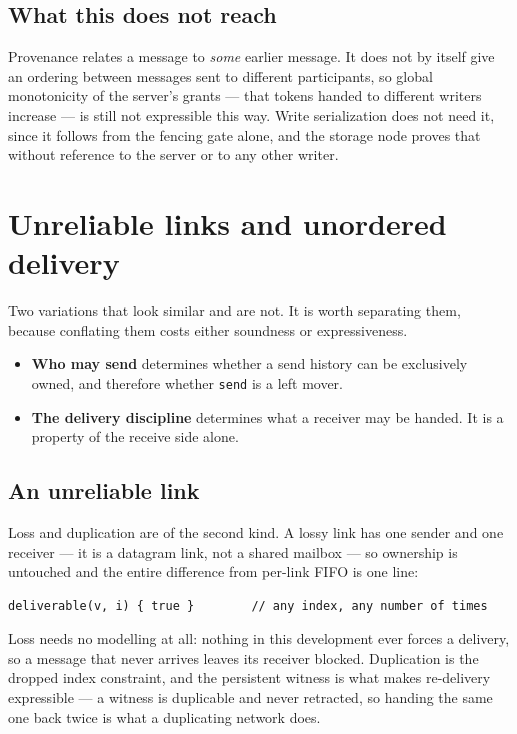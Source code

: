 \documentclass[11pt]{article}
\newcommand{\code}[1]{\texttt{#1}}
\begin{document}
\subsection*{What this does not reach}

Provenance relates a message to \emph{some} earlier message. It does not by
itself give an ordering between messages sent to different participants, so
global monotonicity of the server's grants --- that tokens handed to different
writers increase --- is still not expressible this way. Write serialization does
not need it, since it follows from the fencing gate alone, and the storage node
proves that without reference to the server or to any other writer.

\section{Unreliable links and unordered delivery}\label{sec:unreliable}

Two variations that look similar and are not. It is worth separating them,
because conflating them costs either soundness or expressiveness.

\begin{itemize}[leftmargin=1.2em,itemsep=3pt,topsep=3pt]
\item \textbf{Who may send} determines whether a send history can be
  exclusively owned, and therefore whether \code{send} is a left mover.
\item \textbf{The delivery discipline} determines what a receiver may be handed.
  It is a property of the receive side alone.
\end{itemize}

\subsection*{An unreliable link}

Loss and duplication are of the second kind. A lossy link has one sender and one
receiver --- it is a datagram link, not a shared mailbox --- so ownership is
untouched and the entire difference from per-link FIFO is one line:

\begin{lstlisting}
deliverable(v, i) { true }        // any index, any number of times
\end{lstlisting}

Loss needs no modelling at all: nothing in this development ever forces a
delivery, so a message that never arrives leaves its receiver blocked.
Duplication is the dropped index constraint, and the persistent witness is what
makes re-delivery expressible --- a witness is duplicable and never retracted,
so handing the same one back twice is what a duplicating network does.
\end{document}
